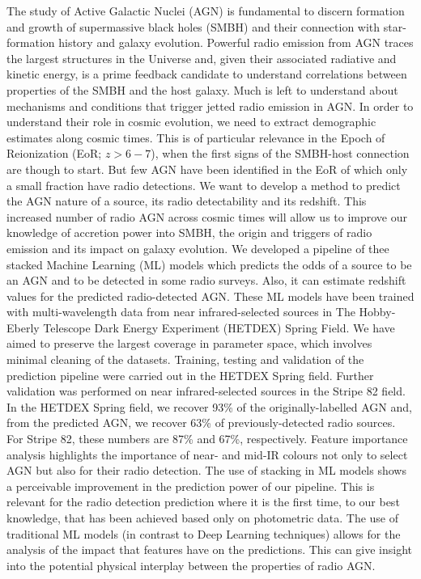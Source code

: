 \documentclass{aa}
\begin{document}
   \date{Received ; accepted }

 
  \abstract
   {The study of Active Galactic Nuclei (AGN) is fundamental to discern formation and growth of supermassive black holes (SMBH) and their connection with star-formation history and galaxy evolution. Powerful radio emission from AGN traces the largest structures in the Universe and, given their associated radiative and kinetic energy, is a prime feedback candidate to understand correlations between properties of the SMBH and the host galaxy. Much is left to understand about mechanisms and conditions that trigger jetted radio emission in AGN. In order to understand their role in cosmic evolution, we need to extract demographic estimates along cosmic times. This is of particular relevance in the Epoch of Reionization (EoR; ${z{>}6-7}$), when the first signs of the SMBH-host connection are though to start. But few AGN have been identified in the EoR of which only a small fraction have radio detections.
   }
   {We want to develop a method to predict the AGN nature of a source, its radio detectability and its redshift. This increased number of radio AGN across cosmic times will allow us to improve our knowledge of accretion power into SMBH, the origin and triggers of radio emission and its impact on galaxy evolution.   
   }
   {We developed a pipeline of thee stacked Machine Learning (ML) models which predicts the odds of a source to be an AGN and to be detected in some radio surveys. Also, it can estimate redshift values for the predicted radio-detected AGN. These ML models have been trained with multi-wavelength data from near infrared-selected sources in The Hobby-Eberly Telescope Dark Energy Experiment (HETDEX) Spring Field. We have aimed to preserve the largest coverage in parameter space, which involves minimal cleaning of the datasets. Training, testing and validation of the prediction pipeline were carried out in the HETDEX Spring field. Further validation was performed on near infrared-selected sources in the Stripe 82 field.
   }
   {In the HETDEX Spring field, we recover 93\% of the originally-labelled AGN and, from the predicted AGN, we recover 63\% of previously-detected radio sources. For Stripe 82, these numbers are 87\% and 67\%, respectively. Feature importance analysis highlights the importance of near- and mid-IR colours not only to select AGN but also for their radio detection.
   }
   {The use of stacking in ML models shows a perceivable improvement in the prediction power of our pipeline. This is relevant for the radio detection prediction where it is the first time, to our best knowledge, that has been achieved based only on photometric data. The use of traditional ML models (in contrast to Deep Learning techniques) allows for the analysis of the impact that features have on the predictions. This can give insight into the potential physical interplay between the properties of radio AGN.}
\end{document}
